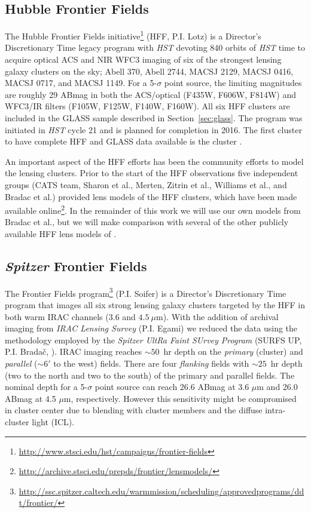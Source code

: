 \subsection{Hubble Frontier Fields}
\label{sec:HFF}

The Hubble Frontier Fields initiative\footnote{\url{http://www.stsci.edu/hst/campaigns/frontier-fields}} (HFF,
P.I. Lotz) is a Director's Discretionary Time legacy program with \emph{HST} devoting 840 orbits of \emph{HST}
time to acquire optical ACS and NIR WFC3 imaging of six of the strongest lensing galaxy clusters on the sky;
Abell 370, Abell 2744, MACSJ 2129, MACSJ 0416, MACSJ 0717, and MACSJ 1149. For a 5-$\sigma$ point source, the
limiting magnitudes are roughly 29 ABmag in both the ACS/optical (F435W, F606W, F814W) and WFC3/IR filters
(F105W, F125W, F140W, F160W).  All six HFF clusters are included in the GLASS sample described in
Section~\ref{sec:glass}.  The program was initiated in \emph{HST} cycle 21 and is planned for completion in 2016.
The first cluster to have complete HFF and GLASS data available is the cluster \cler.

An important aspect of the HFF efforts has been the community efforts
to model the lensing clusters.  Prior to the start of the HFF
observations five independent groups (CATS team, Sharon et al.,
Merten, Zitrin et al., Williams et al., and Bradac et al.) provided
lens models of the HFF clusters, which have been made available
online\footnote{\url{http://archive.stsci.edu/prepds/frontier/lensmodels/}}.
In the remainder of this work we will use our own models from Bradac
et al., but we will make comparison with several of the other publicly
available HFF lens models of \cler.


\subsection{\textit{Spitzer} Frontier Fields}
\label{sec:spitz}

The \spitzer Frontier Fields
program\footnote{\url{http://ssc.spitzer.caltech.edu/warmmission/scheduling/approvedprograms/ddt/frontier/}}
(P.I. Soifer) is a Director's Discretionary Time program that images all six strong lensing galaxy clusters
targeted by the HFF in both warm IRAC channels ($3.6$ and $4.5~\mu$m).  With the addition of archival imaging
from  \emph{IRAC Lensing Survey} (P.I. Egami) we reduced the data using the methodology employed by the
\emph{Spitzer UltRa Faint SUrvey Program} (SURFS UP, P.I. Brada\v{c}, \citealp{2014ApJ...785..108B}). IRAC
imaging reaches $\sim\!50$~hr depth on the \emph{primary} (\cler cluster) and \emph{parallel} ($\sim\!6'$ to the
west) fields.  There are four \emph{flanking} fields with $\sim\!25$~hr depth (two to the north and two to the
south) of the primary and parallel fields. The nominal depth for a 5-$\sigma$ point source can reach 26.6
ABmag at 3.6 $\mu$m and 26.0 ABmag at 4.5 $\mu$m, respectively. However this sensitivity might be compromised in
cluster center due to blending with cluster members and the diffuse intra-cluster light (ICL).

